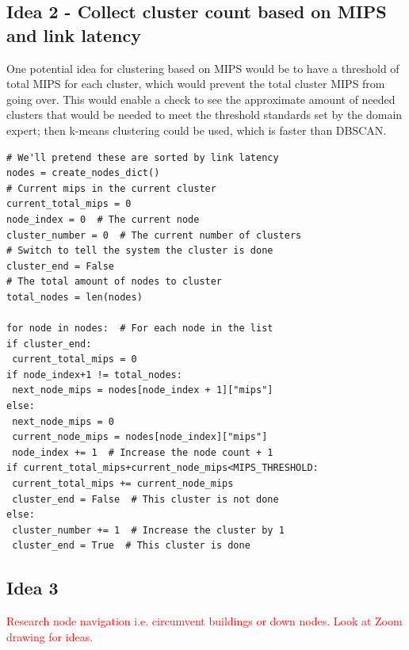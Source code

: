 \documentclass[letterpaper,twocolumn,10pt]{article}
\newcommand\todo[1]{\textcolor{red}{#1}}
\begin{document}
\subsection{Idea 2 - Collect cluster count based on MIPS and link latency} One potential idea for clustering based on MIPS would be to have a threshold of total MIPS for each cluster, which would prevent the total cluster MIPS from going over. This would enable a check to see the approximate amount of needed clusters that would be needed to meet the threshold standards set by the domain expert; then k-means clustering could be used, which is faster than DBSCAN.
\begin{verbatim}
# We'll pretend these are sorted by link latency
nodes = create_nodes_dict()
# Current mips in the current cluster
current_total_mips = 0
node_index = 0  # The current node
cluster_number = 0  # The current number of clusters
# Switch to tell the system the cluster is done
cluster_end = False
# The total amount of nodes to cluster
total_nodes = len(nodes)

for node in nodes:  # For each node in the list
if cluster_end:
 current_total_mips = 0
if node_index+1 != total_nodes:
 next_node_mips = nodes[node_index + 1]["mips"]
else:
 next_node_mips = 0
 current_node_mips = nodes[node_index]["mips"]
 node_index += 1  # Increase the node count + 1
if current_total_mips+current_node_mips<MIPS_THRESHOLD:
 current_total_mips += current_node_mips
 cluster_end = False  # This cluster is not done
else:
 cluster_number += 1  # Increase the cluster by 1
 cluster_end = True  # This cluster is done
\end{verbatim}

\subsection{Idea 3} \todo{Research node navigation i.e. circumvent buildings or down nodes. Look at Zoom drawing for ideas.}
\end{document}

